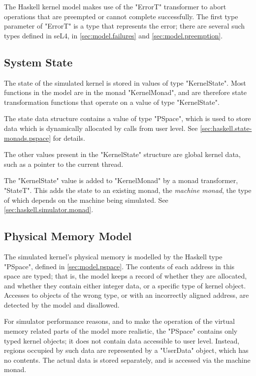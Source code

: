 The Haskell kernel model makes use of the "ErrorT" transformer to abort operations that are preempted or cannot complete successfully. The first type parameter of "ErrorT" is a type that represents the error; there are several such types defined in seL4, in \autoref{sec:model.failures} and \autoref{sec:model.preemption}.

\subsection[system-state]{System State}

The state of the simulated kernel is stored in values of type "KernelState". Most functions in the model are in the monad "KernelMonad", and are therefore state transformation functions that operate on a value of type "KernelState".

The state data structure contains a value of type "PSpace", which is used to store data which is dynamically allocated by calls from user level. See \autoref{sec:haskell.state-monads.pspace} for details.

The other values present in the "KernelState" structure are global kernel data, such as a pointer to the current thread.

The "KernelState" value is added to "KernelMonad" by a monad transformer, "StateT". This adds the state to an existing monad, the \emph{machine monad}, the type of which depends on the machine being simulated. See \autoref{sec:haskell.simulator.monad}.

\subsection[pspace]{Physical Memory Model}

The simulated kernel's physical memory is modelled by the Haskell type "PSpace", defined in \autoref{sec:model.pspace}. The contents of each address in this space are typed; that is, the model keeps a record of whether they are allocated, and whether they contain either integer data, or a specific type of kernel object. Accesses to objects of the wrong type, or with an incorrectly aligned address, are detected by the model and disallowed.

For simulator performance reasons, and to make the operation of the virtual memory related parts of the model more realistic, the "PSpace" contains only typed kernel objects; it does not contain data accessible to user level. Instead, regions occupied by such data are represented by a "UserData" object, which has no contents. The actual data is stored separately, and is accessed via the machine monad.

